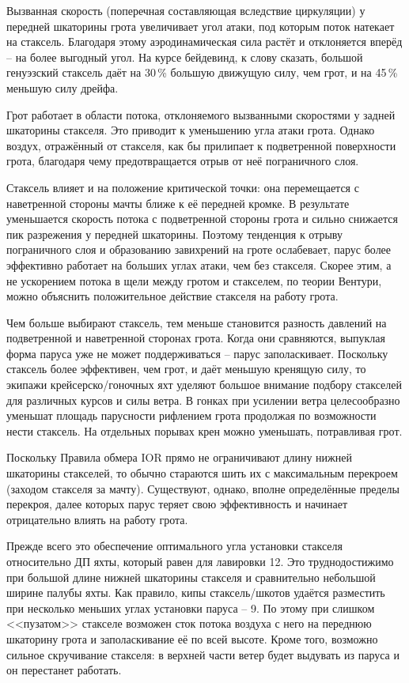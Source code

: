 Вызванная скорость (поперечная составляющая вследствие циркуляции) у передней шкаторины грота увеличивает угол атаки, под которым поток натекает на стаксель. Благодаря этому аэродинамическая сила растёт и отклоняется вперёд \--- на более выгодный угол. На курсе бейдевинд, к слову сказать, большой генуэзский стаксель даёт на 30\,\% большую движущую силу, чем грот, и на 45\,\% меньшую силу дрейфа.
 
Грот работает в области потока, отклоняемого вызванными скоростями у задней шкаторины стакселя. Это приводит к уменьшению угла атаки грота. Однако воздух, отражённый от стакселя, как бы прилипает к подветренной поверхности грота, благодаря чему предотвращается отрыв от неё пограничного слоя.

Стаксель влияет и на положение критической точки: она перемещается с наветренной стороны мачты ближе к её передней кромке. В результате уменьшается скорость потока с подветренной стороны грота и сильно снижается пик разрежения у передней шкаторины. Поэтому тенденция к отрыву пограничного слоя и образованию завихрений на гроте ослабевает, парус более эффективно работает на больших углах атаки, чем без стакселя. Скорее этим, а не ускорением потока в щели между гротом и стакселем, по теории Вентури, можно объяснить положительное действие стакселя на работу грота.

Чем больше выбирают стаксель, тем меньше становится разность давлений на подветренной и наветренной сторонах грота. Когда они сравняются, выпуклая форма паруса уже не может поддерживаться \--- парус заполаскивает. Поскольку стаксель более эффективен, чем грот, и даёт меньшую кренящую силу, то экипажи крейсерско\-/гоночных яхт уделяют большое внимание подбору стакселей для различных курсов и силы ветра. В гонках при усилении ветра целесообразно уменьшат площадь парусности рифлением грота продолжая по возможности нести стаксель. На отдельных порывах крен можно уменьшать, потравливая грот.

Поскольку Правила обмера IOR прямо не ограничивают длину нижней шкаторины стакселей, то обычно стараются шить их с максимальным перекроем (заходом стакселя за мачту). Существуют, однако, вполне определённые пределы перекроя, далее которых парус теряет свою эффективность и начинает отрицательно влиять на работу грота.

Прежде всего это обеспечение оптимального угла установки стакселя относительно ДП яхты, который равен для лавировки 12\gr. Это труднодостижимо при большой длине нижней шкаторины стакселя и сравнительно небольшой ширине палубы яхты. Как правило, кипы стаксель\-/шкотов удаётся разместить при несколько меньших углах установки паруса \--- 9\gr. По этому при слишком <<пузатом>> стакселе возможен сток потока воздуха с него на переднюю шкаторину грота и заполаскивание её по всей высоте. Кроме того, возможно сильное скручивание стакселя: в верхней части ветер будет выдувать из паруса и он перестанет работать. 

